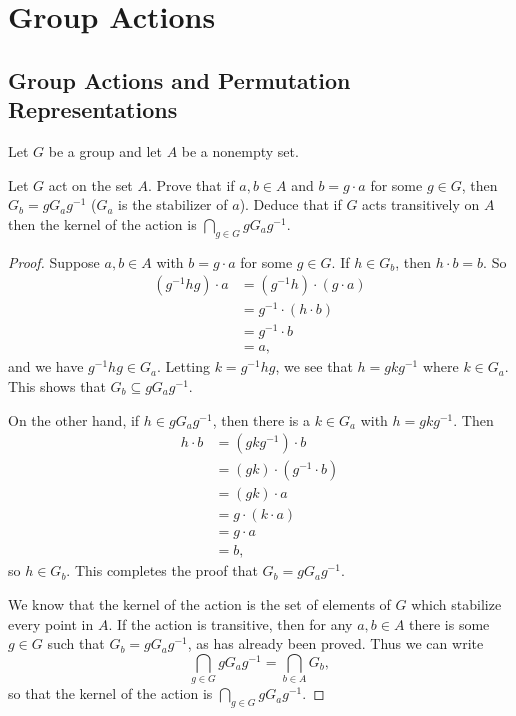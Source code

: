 \chapter{Group Actions}

\section{Group Actions and Permutation Representations}

Let $G$ be a group and let $A$ be a nonempty set.

\label{exercise:group-action:stab-b-conjugate-stab-a}
Let $G$ act on the set $A$. Prove that if $a,b\in A$ and
$b = g\cdot a$ for some $g\in G$, then $G_b = gG_ag^{-1}$ ($G_a$ is
the stabilizer of $a$). Deduce that if $G$ acts transitively on $A$
then the kernel of the action is $\bigcap_{g\in G} gG_ag^{-1}$.
\begin{proof}
  Suppose $a,b\in A$ with $b = g\cdot a$ for some $g\in G$. If
  $h\in G_b$, then $h\cdot b = b$. So
  \begin{align*}
    (g^{-1}hg)\cdot a
    &= (g^{-1}h)\cdot(g\cdot a) \\
    &= g^{-1}\cdot(h\cdot b) \\
    &= g^{-1}\cdot b \\
    &= a,
  \end{align*}
  and we have $g^{-1}hg\in G_a$. Letting $k = g^{-1}hg$, we see that
  $h = gkg^{-1}$ where $k\in G_a$. This shows that
  $G_b\subseteq gG_ag^{-1}$.

  On the other hand, if $h\in gG_ag^{-1}$, then there is a $k\in G_a$
  with $h = gkg^{-1}$. Then
  \begin{align*}
    h\cdot b
    &= (gkg^{-1})\cdot b \\
    &= (gk)\cdot(g^{-1}\cdot b) \\
    &= (gk)\cdot a \\
    &= g\cdot(k\cdot a) \\
    &= g\cdot a \\
    &= b,
  \end{align*}
  so $h\in G_b$. This completes the proof that $G_b = gG_ag^{-1}$.

  We know that the kernel of the action is the set of elements of $G$
  which stabilize every point in $A$. If the action is transitive,
  then for any $a,b\in A$ there is some $g\in G$ such that
  $G_b = gG_ag^{-1}$, as has already been proved. Thus we can write
  \begin{equation*}
    \bigcap_{g\in G}gG_ag^{-1} = \bigcap_{b\in A}G_b,
  \end{equation*}
  so that the kernel of the action is $\bigcap_{g\in G}gG_ag^{-1}$.
\end{proof}

